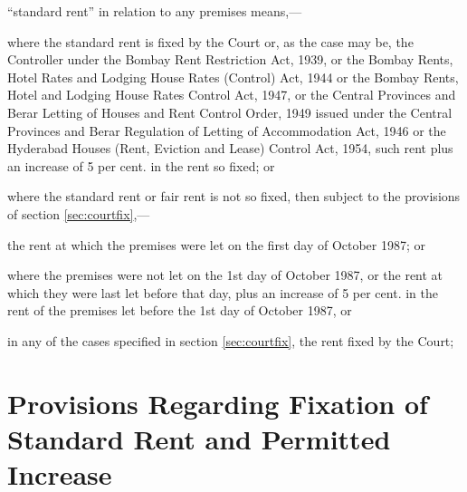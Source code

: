 \documentclass{mhact}
\begin{document}
\begin{subsectionlist}
  
\item ``standard rent'' in relation to any premises
  means,---\label{it:stdrent}
  \begin{clause}
  \item where the standard rent is fixed by the Court or, as the case
    may be, the Controller under the Bombay Rent Restriction Act,
    1939, or the Bombay Rents, Hotel Rates and Lodging House Rates
    (Control) Act, 1944 or the Bombay Rents, Hotel and Lodging House
    Rates Control Act, 1947, or the Central Provinces and Berar
    Letting of Houses and Rent Control Order, 1949 issued under the
    Central Provinces and Berar Regulation of Letting of Accommodation
    Act, 1946 or the Hyderabad Houses (Rent, Eviction and Lease)
    Control Act, 1954, such rent plus an increase of 5 per cent. in
    the rent so fixed; or
  \item where the standard rent or fair rent is not so fixed, then
    subject to the provisions of section \ref{sec:courtfix},--- \label{it:stdrentunfix}
    \begin{subclause}
    \item the rent at which the premises were let on the first day of
      October 1987; or \label{it:oct87}
    \item where the premises were not let on the 1st day of October
      1987, or the rent at which they were last let before that day,
      plus an increase of 5 per cent.  in the rent of the premises let
      before the 1st day of October 1987, or \label{it:oct87no}
    \end{subclause}
  \item in any of the cases specified in section \ref{sec:courtfix},
    the rent fixed by the Court;
\end{clause}
\end{subsectionlist}


\chapter{Provisions Regarding Fixation of Standard Rent and Permitted Increase}
\end{document}
